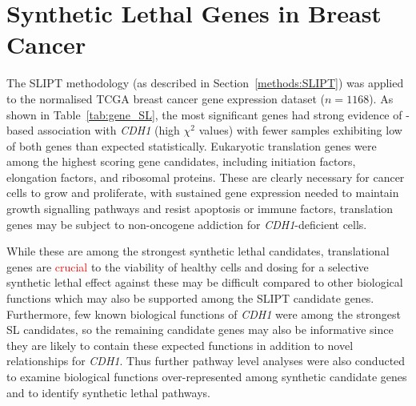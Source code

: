 \section{Synthetic Lethal Genes in Breast Cancer} \label{chapt3:exprSL_genes}

The \gls{SLIPT} methodology (as described in Section~\ref{methods:SLIPT}) was applied to the normalised \gls{TCGA} breast cancer \gls{gene expression} dataset ($n = 1168$). As shown in Table~\ref{tab:gene_SL}, the most significant genes had strong evidence of -based association with \textit{CDH1} (high $\chi^2$ values) with fewer samples exhibiting low  of both genes than expected statistically. Eukaryotic translation genes were among the highest scoring gene candidates, including initiation factors, elongation factors, and ribosomal proteins. These are clearly necessary for cancer cells to grow and proliferate, with sustained \gls{gene expression} needed to maintain growth signalling \glspl{pathway} and resist apoptosis or immune factors, translation genes may be subject to \gls{non-oncogene addiction} for \textit{CDH1}-deficient cells.

While these are among the strongest \gls{synthetic lethal} candidates, translational genes are \textcolor{red}{crucial} to the viability of healthy cells and dosing for a selective \gls{synthetic lethal} effect against these may be difficult compared to other biological functions which may also be supported among the \gls{SLIPT} candidate genes. Furthermore, few known biological functions of \textit{CDH1} were among the strongest SL candidates, so the remaining candidate genes may also be informative since they are likely to contain these expected functions in addition to novel relationships for \textit{CDH1}. Thus further \gls{pathway} level analyses were also conducted to examine biological functions over-represent\-ed among synthetic candidate genes and to identify \gls{synthetic lethal} \glspl{pathway}.

